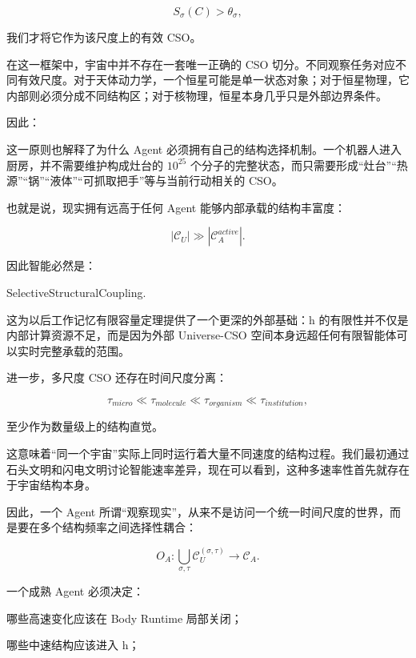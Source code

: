 \[
S_{\sigma}(C)
>
\theta_{\sigma},
\]

我们才将它作为该尺度上的有效 CSO。

在这一框架中，宇宙中并不存在一套唯一正确的 CSO 切分。不同观察任务对应不同有效尺度。对于天体动力学，一个恒星可能是单一状态对象；对于恒星物理，它内部则必须分成不同结构区；对于核物理，恒星本身几乎只是外部边界条件。

因此：

\begin{statementbox}
\centering
{}
\end{statementbox}

这一原则也解释了为什么 Agent 必须拥有自己的结构选择机制。一个机器人进入厨房，并不需要维护构成灶台的 $10^{25}$ 个分子的完整状态，而只需要形成“灶台”“热源”“锅”“液体”“可抓取把手”等与当前行动相关的 CSO。

也就是说，现实拥有远高于任何 Agent 能够内部承载的结构丰富度：

\[
\left|
\mathcal{C}_{U}
\right|
\gg
\left|
\mathcal{C}_{A}^{active}
\right|.
\]

因此智能必然是：

\begin{statementbox}
SelectiveStructuralCoupling.
\end{statementbox}

这为以后工作记忆有限容量定理提供了一个更深的外部基础：h 的有限性并不仅是内部计算资源不足，而是因为外部 Universe-CSO 空间本身远超任何有限智能体可以实时完整承载的范围。

进一步，多尺度 CSO 还存在时间尺度分离：

\[
\tau_{micro}
\ll
\tau_{molecule}
\ll
\tau_{organism}
\ll
\tau_{institution},
\]

至少作为数量级上的结构直觉。

这意味着“同一个宇宙”实际上同时运行着大量不同速度的结构过程。我们最初通过石头文明和闪电文明讨论智能速率差异，现在可以看到，这种多速率性首先就存在于宇宙结构本身。

因此，一个 Agent 所谓“观察现实”，从来不是访问一个统一时间尺度的世界，而是要在多个结构频率之间选择性耦合：

\[
O_A:
\bigcup_{\sigma,\tau}
\mathcal{C}_{U}^{(\sigma,\tau)}
\rightarrow
\mathcal{C}_{A}.
\]

一个成熟 Agent 必须决定：

哪些高速变化应该在 Body Runtime 局部关闭；

哪些中速结构应该进入 h；

